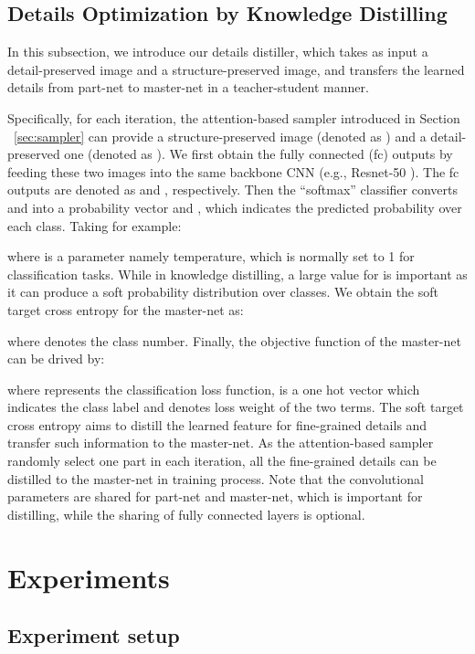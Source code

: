 \documentclass[10pt,twocolumn,letterpaper]{article}
\begin{document}
\subsection{Details Optimization by Knowledge Distilling}
\label{sec:distiller}
In this subsection, we introduce our details distiller, which takes as input a detail-preserved image and a structure-preserved image, and transfers the learned details from part-net to master-net in a teacher-student manner.

Specifically, for each iteration, the attention-based sampler introduced in Section ~\ref{sec:sampler} can provide a structure-preserved image (denoted as ) and a detail-preserved one (denoted as ). We first obtain the fully connected (fc) outputs by feeding these two images into the same backbone CNN (e.g., Resnet-50 \cite{ResNet}). The fc outputs are denoted as  and , respectively. Then the ``softmax'' classifier converts  and  into a probability vector  and , which indicates the predicted probability over each class. Taking  for example:

where  is a parameter namely temperature, which is normally set to 1 for classification tasks. While in knowledge distilling, a large value for  is important as it can produce a soft probability distribution over classes. We obtain the soft target cross entropy \cite{hinton2014distilling} for the master-net as:

where  denotes the class number. Finally, the objective function of the master-net can be drived by:

where  represents the classification loss function,  is a one hot vector which indicates the class label and  denotes loss weight of the two terms. The soft target cross entropy aims to distill the learned feature for fine-grained details and transfer such information to the master-net. As the attention-based sampler randomly select one part in each iteration, all the fine-grained details can be distilled to the master-net in training process. Note that the convolutional parameters are shared for part-net and master-net, which is important for distilling, while the sharing of fully connected layers is optional.

\section{Experiments}
\label{exp}
\subsection{Experiment setup}
\end{document}
